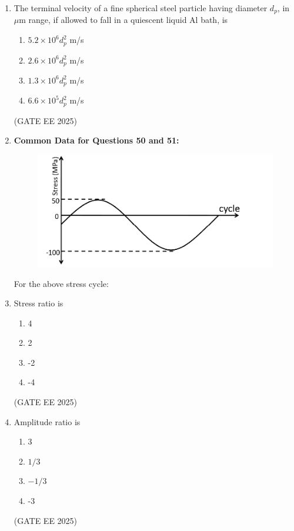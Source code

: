 \documentclass[11pt, letterpaper]{article}
\theoremstyle{remark}
\begin{document}
\begin{enumerate}
\item The terminal velocity of a fine spherical steel particle having diameter $d_p$, in $\mu$m range, if allowed to fall in a quiescent liquid Al bath, is
\begin{multicols}{2}
\begin{enumerate}  
\item $5.2 \times 10^6 d_p^2$ m/s
\item $2.6 \times 10^6 d_p^2$ m/s
\item $1.3 \times 10^6 d_p^2$ m/s
\item $6.6 \times 10^5 d_p^2$ m/s
\end{enumerate}
\end{multicols}
\hfill(GATE EE 2025)

\item[] \textbf{Common Data for Questions 50 and 51:} 

\begin{figure}
    \centering
    \includegraphics[width=0.5\linewidth]{figs/image3.png}
    \label{fig:placeholder}
\end{figure}

For the above stress cycle:

\item Stress ratio is
\begin{multicols}{2}
\begin{enumerate}  
\item 4
\item 2
\item -2
\item -4
\end{enumerate}
\end{multicols}
\hfill(GATE EE 2025)

\item Amplitude ratio is
\begin{multicols}{2}
\begin{enumerate}  
\item 3
\item $1/3$
\item $-1/3$
\item -3
\end{enumerate}
\end{multicols}
\hfill(GATE EE 2025)


\end{enumerate}
\end{document}
